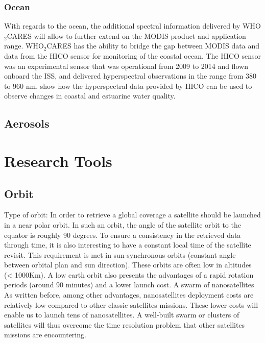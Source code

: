 \documentclass{scrartcl}
\newcommand{\whocares}{WHO$_2$CARES }
\begin{document}
\subsubsection{Ocean}
\label{sec:orgde76ad3}

With regards to the ocean, the additional spectral information delivered by \whocares
will allow to further extend on the MODIS product and application range. \whocares has
the ability to bridge the gap between MODIS data and data from the HICO sensor for
monitoring of the coastal ocean. The HICO sensor was an experimental sensor that was
operational from 2009 to 2014 and flown onboard the ISS, and delivered hyperspectral
observations in the range from 380 to  960 nm. \citet{keith} show how the hyperspectral
data provided by HICO can be used to observe changes in coastal and estuarine water quality.


\subsection{Aerosols}
\label{sec:org701d1e2}
\section{Research Tools}
\label{sec:org58312b2}

\subsection{Orbit}
\label{sec:org1cac497}

    Type of orbit: In order to retrieve a global coverage a satellite should be
launched in a near polar orbit. In such an orbit, the angle of the satellite
orbit to the equator is roughly 90 degrees. To ensure a consistency in the
retrieved data through time, it is also interesting to have a constant local
time of the satellite revisit. This requirement is met in sun-synchronous orbits
(constant angle between orbital plan and sun direction). These orbits are often
low in altitudes (< 1000Km). A low earth orbit also presents the advantages of a
rapid rotation periods (around 90 minutes) and a lower launch cost. A swarm of
nanosatellites As written before, among other advantages, nanosatellites
deployment costs are relatively low compared to other classic satellites
missions. These lower costs will enable us to launch tens of nanosatellites. A
well-built swarm or clusters of satellites will thus overcome the time
resolution problem that other satellites missions are encountering.
\end{document}
